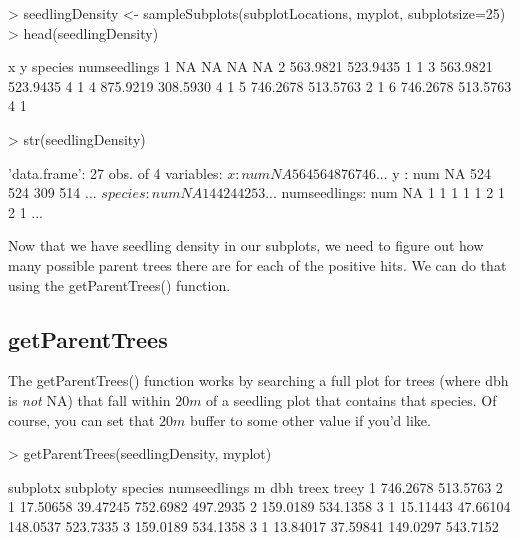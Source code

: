 \documentclass{article}
\begin{document}
\begin{Schunk}
\begin{Sinput}
> seedlingDensity <- sampleSubplots(subplotLocations, myplot, subplotsize=25)
> head(seedlingDensity)
\end{Sinput}
\begin{Soutput}
         x        y species numseedlings
1       NA       NA      NA           NA
2 563.9821 523.9435       1            1
3 563.9821 523.9435       4            1
4 875.9219 308.5930       4            1
5 746.2678 513.5763       2            1
6 746.2678 513.5763       4            1
\end{Soutput}
\begin{Sinput}
> str(seedlingDensity)
\end{Sinput}
\begin{Soutput}
'data.frame':	27 obs. of  4 variables:
 $ x           : num  NA 564 564 876 746 ...
 $ y           : num  NA 524 524 309 514 ...
 $ species     : num  NA 1 4 4 2 4 4 2 5 3 ...
 $ numseedlings: num  NA 1 1 1 1 1 2 1 2 1 ...
\end{Soutput}
\end{Schunk}

Now that we have seedling density in our subplots, we need to figure out how many possible parent trees there are for each of the positive hits. We can do that using the getParentTrees() function.

\subsection{getParentTrees}

The getParentTrees() function works by searching a full plot for trees (where dbh is \textit{not} NA) that fall within $20 m$ of a seedling plot that contains that species. Of course, you can set that $20 m$ buffer to some other value if you'd like.

\begin{Schunk}
\begin{Sinput}
> getParentTrees(seedlingDensity, myplot)
\end{Sinput}
\begin{Soutput}
  subplotx subploty species numseedlings        m      dbh    treex    treey
1 746.2678 513.5763       2            1 17.50658 39.47245 752.6982 497.2935
2 159.0189 534.1358       3            1 15.11443 47.66104 148.0537 523.7335
3 159.0189 534.1358       3            1 13.84017 37.59841 149.0297 543.7152
\end{Soutput}
\end{Schunk}





\end{document}

